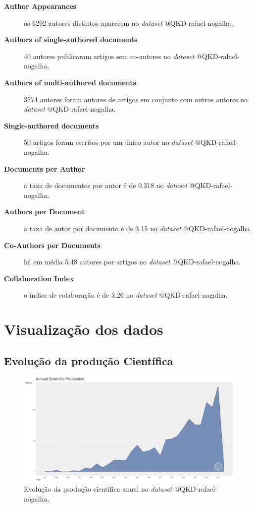 \begin{description}
    \item[\textbf{Author Appearances}] os 6292 autores distintos aparecem no \textit{dataset} @QKD-rafael-nogalha.
    \item[\textbf{Authors of single-authored documents}] 40 autores publicaram artigos sem co-autores no \textit{dataset} @QKD-rafael-nogalha.
    \item[\textbf{Authors of multi-authored documents}] 3574 autores foram autores de artigos em conjunto com outros autores no \textit{dataset} @QKD-rafael-nogalha.
    \item[\textbf{Single-authored documents}] 50 artigos foram escritos por um único autor no \textit{dataset} @QKD-rafael-nogalha.
    \item[\textbf{Documents per Author}] a taxa de documentos por autor é de 0.318 no \textit{dataset} @QKD-rafael-nogalha.
    \item[\textbf{Authors per Document}] a taxa de autor por documento é de 3.15 no \textit{dataset} @QKD-rafael-nogalha.
    \item[\textbf{Co-Authors per Documents}] há em média 5.48 autores por artigos no \textit{dataset} @QKD-rafael-nogalha.
    \item[\textbf{Collaboration Index}] o índice de colaboração é de 3.26 no \textit{dataset} @QKD-rafael-nogalha.
\end{description}

\section{Visualização dos dados}

\subsection{Evolução da produção Científica}

\begin{figure}[H]
    \centering
    \includegraphics[width=1\textwidth]{experiments/rafaelnogalha/PesquisaBibliografica/QKDSegurancaComputacional/images/producao_cientifica_anual.png}
    \caption{Evolução da produção científica anual no \textit{dataset} @QKD-rafael-nogalha.}
    \label{fig:evol:anual:@QKD-rafael-nogalha}
\end{figure}

